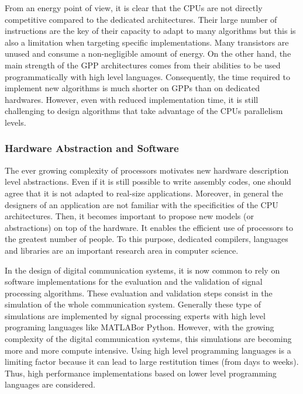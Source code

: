 From an energy point of view, it is clear that the CPUs are not directly
competitive compared to the dedicated architectures. Their large number of
instructions are the key of their capacity to adapt to many algorithms but this
is also a limitation when targeting specific implementations. Many transistors
are unused and consume a non-negligible amount of energy. On the other hand, the
main strength of the GPP architectures comes from their abilities to be used
programmatically with high level languages. Consequently, the time required to
implement new algorithms is much shorter on GPPs than on dedicated hardwares.
However, even with reduced implementation time, it is still challenging to
design algorithms that take advantage of the CPUs parallelism levels.

\subsubsection*{Hardware Abstraction and Software}

The ever growing complexity of processors motivates new hardware description
level abstractions. Even if it is still possible to write assembly codes, one
should agree that it is not adapted to real-size applications. Moreover, in
general the designers of an application are not familiar with the specificities
of the CPU architectures. Then, it becomes important to propose new models (or
abstractions) on top of the hardware. It enables the efficient use of processors
to the greatest number of people. To this purpose, dedicated compilers,
languages and libraries are an important research area in computer science.

In the design of digital communication systems, it is now common to rely on
software implementations for the evaluation and the validation of signal
processing algorithms. These evaluation and validation steps consist in
the simulation of the whole communication system. Generally these type of
simulations are implemented by signal processing experts with high level
programing languages like MATLAB\R or Python. However, with the growing
complexity of the digital communication systems, this simulations are becoming
more and more compute intensive. Using high level programming languages is a
limiting factor because it can lead to large restitution times (from days to
weeks). Thus, high performance implementations based on lower level programming
languages are considered.

